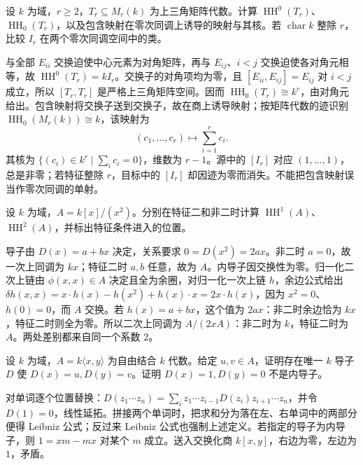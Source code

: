 \begin{optionalexercise}\label{b4:ex:12-upper-triangular}
	设 \(k\) 为域，\(r\ge2\)，\(T_r\subseteq M_r(k)\) 为上三角矩阵代数。计算 \(\operatorname{HH}^0(T_r)\)、\(\operatorname{HH}_0(T_r)\)，以及包含映射在零次同调上诱导的映射与其核。若 \(\operatorname{char}k\) 整除 \(r\)，比较 \(I_r\) 在两个零次同调空间中的类。
\end{optionalexercise}
\begin{solution}
	与全部 \(E_{ii}\) 交换迫使中心元素为对角矩阵，再与 \(E_{ij}\)、\(i<j\) 交换迫使各对角元相等，故 \(\operatorname{HH}^0(T_r)=kI_r\)。交换子的对角项均为零，且 \([E_{ii},E_{ij}]=E_{ij}\) 对 \(i<j\) 成立，所以 \([T_r,T_r]\) 是严格上三角矩阵空间。因而 \(\operatorname{HH}_0(T_r)\cong k^r\)，由对角元给出。包含映射将交换子送到交换子，故在商上诱导映射；按矩阵代数的迹识别 \(\operatorname{HH}_0(M_r(k))\cong k\)，该映射为
	\[
		(c_1,\ldots,c_r)\longmapsto\sum_{i=1}^r c_i.
	\]
	其核为 \(\{(c_i)\in k^r\mid\sum_i c_i=0\}\)，维数为 \(r-1\)。源中的 \([I_r]\) 对应 \((1,\ldots,1)\)，总是非零；若特征整除 \(r\)，目标中的 \([I_r]\) 却因迹为零而消失。不能把包含映射误当作零次同调的单射。
\end{solution}

\begin{optionalexercise}\label{b4:ex:12-dual-derivation-characteristic}
	设 \(k\) 为域，\(A=k[x]/(x^2)\)。分别在特征二和非二时计算 \(\operatorname{HH}^1(A)\)、\(\operatorname{HH}^2(A)\)，并标出特征条件进入的位置。
\end{optionalexercise}
\begin{solution}
	导子由 \(D(x)=a+bx\) 决定，关系要求 \(0=D(x^2)=2ax\)。非二时 \(a=0\)，故一次上同调为 \(kx\)；特征二时 \(a,b\) 任意，故为 \(A\)。内导子因交换性为零。归一化二次上链由 \(\phi(x,x)\in A\) 决定且全为余圈，对归一化一次上链 \(h\)，余边公式给出 \(\delta h(x,x)=x\cdot h(x)-h(x^2)+h(x)\cdot x=2x\cdot h(x)\)，因为 \(x^2=0\)、\(h(0)=0\)，而 \(A\) 交换。若 \(h(x)=a+bx\)，这个值为 \(2ax\)：非二时余边恰为 \(kx\)，特征二时则全为零。所以二次上同调为 \(A/(2xA)\)：非二时为 \(k\)，特征二时为 \(A\)。两处差别都来自同一个系数 \(2\)。
\end{solution}

\begin{optionalexercise}\label{b4:ex:12-free-algebra-derivation}
	设 \(k\) 为域，\(A=k\langle x,y\rangle\) 为自由结合 \(k\) 代数。给定 \(u,v\in A\)，证明存在唯一 \(k\) 导子 \(D\) 使 \(D(x)=u,D(y)=v\)。证明 \(D(x)=1,D(y)=0\) 不是内导子。
\end{optionalexercise}
\begin{solution}
	对单词逐个位置替换：\(D(z_1\cdots z_n)=\sum_i z_1\cdots z_{i-1}D(z_i)z_{i+1}\cdots z_n\)，并令 \(D(1)=0\)，线性延拓。拼接两个单词时，把求和分为落在左、右单词中的两部分便得 Leibniz 公式；反过来 Leibniz 公式也强制上述定义。若指定的导子为内导子，则 \(1=xm-mx\) 对某个 \(m\) 成立。送入交换化商 \(k[x,y]\)，右边为零，左边为 \(1\)，矛盾。
\end{solution}

